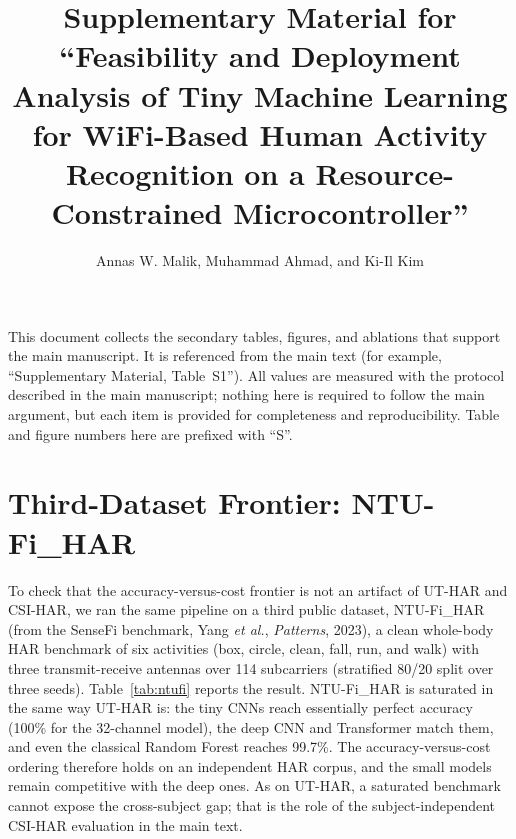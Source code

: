 \documentclass[10pt,journal,twocolumn]{IEEEtran}
\begin{document}
\title{Supplementary Material for\\``Feasibility and Deployment Analysis of Tiny Machine Learning for WiFi-Based Human Activity Recognition on a Resource-Constrained Microcontroller''}
\author{Annas W. Malik, Muhammad Ahmad, and Ki-Il Kim}
\maketitle

\noindent This document collects the secondary tables, figures, and ablations that support the main manuscript. It is referenced from the main text (for example, ``Supplementary Material, Table~S1''). All values are measured with the protocol described in the main manuscript; nothing here is required to follow the main argument, but each item is provided for completeness and reproducibility. Table and figure numbers here are prefixed with ``S''.

\section{Third-Dataset Frontier: NTU-Fi\_HAR}
To check that the accuracy-versus-cost frontier is not an artifact of UT-HAR and CSI-HAR, we ran the same pipeline on a third public dataset, NTU-Fi\_HAR (from the SenseFi benchmark, Yang \emph{et al.}, \emph{Patterns}, 2023), a clean whole-body HAR benchmark of six activities (box, circle, clean, fall, run, and walk) with three transmit-receive antennas over 114 subcarriers (stratified 80/20 split over three seeds). Table~\ref{tab:ntufi} reports the result. NTU-Fi\_HAR is saturated in the same way UT-HAR is: the tiny CNNs reach essentially perfect accuracy (100\% for the 32-channel model), the deep CNN and Transformer match them, and even the classical Random Forest reaches 99.7\%. The accuracy-versus-cost ordering therefore holds on an independent HAR corpus, and the small models remain competitive with the deep ones. As on UT-HAR, a saturated benchmark cannot expose the cross-subject gap; that is the role of the subject-independent CSI-HAR evaluation in the main text.
\end{document}
